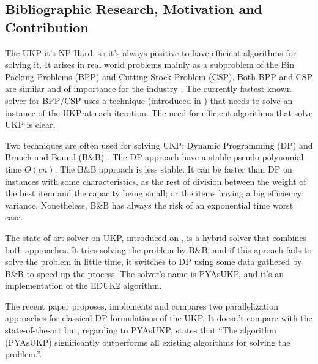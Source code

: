 \documentclass[runningheads,a4paper]{llncs}
\begin{document}
\subsection{Bibliographic Research, Motivation and Contribution}

The UKP it's NP-Hard, so it's always positive to have efficient algorithms for solving it. It arises in real world problems mainly as a subproblem of the Bin Packing Problems (BPP) and Cutting Stock Problem (CSP). Both BPP and CSP are similar and of importance for the industry \cite{survey2014}\cite{gg-1}\cite{gg-2}. The currently fastest known solver for BPP/CSP\cite{survey2014}\cite{belov} uses a technique (introduced in \cite{gg-1}) that needs to solve an instance of the UKP at each iteration. The need for efficient algorithms that solve UKP is clear.

Two techniques are often used for solving UKP: Dynamic Programming (DP)\cite[p. 214]{gar72}\cite{eduk}\cite[p. 311]{tchu} and Branch and Bound (B\&B) \cite{mtu2}. The DP approach have a stable pseudo-polynomial time \(O(c n)\). The B\&B approach is less stable. It can be faster than DP on instances with some characteristics, as the rest of division between the weight of the best item and the capacity being small; or the items having a big efficiency variance. Nonetheless, B\&B has always the risk of an exponential time worst case.

The state of art solver on UKP, introduced on \cite{pya}, is a hybrid solver that combines both approaches. It tries solving the problem by B\&B, and if this aproach fails to solve the problem in little time, it switches to DP using some data gathered by B\&B to speed-up the process. The solver's name is PYAsUKP, and it's an implementation of the EDUK2 algorithm.%

The recent paper \cite{parallellUKP} proposes, implements and compares two parallelization approaches for classical DP formulations of the UKP. It doesn't compare with the state-of-the-art but, regarding to PYAsUKP, states that ``The algorithm (PYAsUKP) significantly outperforms all existing algorithms for solving the problem.''.
\end{document}
